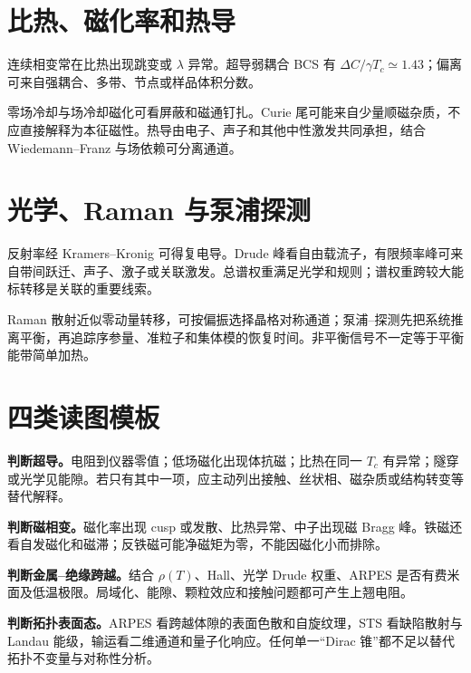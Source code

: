 \section{比热、磁化率和热导}
连续相变常在比热出现跳变或 $\lambda$ 异常。超导弱耦合 BCS 有
$\Delta C/\gamma T_c\simeq1.43$；偏离可来自强耦合、多带、节点或样品体积分数。

零场冷却与场冷却磁化可看屏蔽和磁通钉扎。Curie 尾可能来自少量顺磁杂质，不应直接解释为本征磁性。热导由电子、声子和其他中性激发共同承担，结合 Wiedemann--Franz 与场依赖可分离通道。

\section{光学、Raman 与泵浦探测}
反射率经 Kramers--Kronig 可得复电导。Drude 峰看自由载流子，有限频率峰可来自带间跃迁、声子、激子或关联激发。总谱权重满足光学和规则；谱权重跨较大能标转移是关联的重要线索。

Raman 散射近似零动量转移，可按偏振选择晶格对称通道；泵浦--探测先把系统推离平衡，再追踪序参量、准粒子和集体模的恢复时间。非平衡信号不一定等于平衡能带简单加热。

\section{四类读图模板}
\begin{examplebox}
\textbf{判断超导。}电阻到仪器零值；低场磁化出现体抗磁；比热在同一 $T_c$ 有异常；隧穿或光学见能隙。若只有其中一项，应主动列出接触、丝状相、磁杂质或结构转变等替代解释。
\end{examplebox}
\begin{examplebox}
\textbf{判断磁相变。}磁化率出现 cusp 或发散、比热异常、中子出现磁 Bragg 峰。铁磁还看自发磁化和磁滞；反铁磁可能净磁矩为零，不能因磁化小而排除。
\end{examplebox}
\begin{examplebox}
\textbf{判断金属--绝缘跨越。}结合 $\rho(T)$、Hall、光学 Drude 权重、ARPES 是否有费米面及低温极限。局域化、能隙、颗粒效应和接触问题都可产生上翘电阻。
\end{examplebox}
\begin{examplebox}
\textbf{判断拓扑表面态。}ARPES 看跨越体隙的表面色散和自旋纹理，STS 看缺陷散射与 Landau 能级，输运看二维通道和量子化响应。任何单一“Dirac 锥”都不足以替代拓扑不变量与对称性分析。
\end{examplebox}

